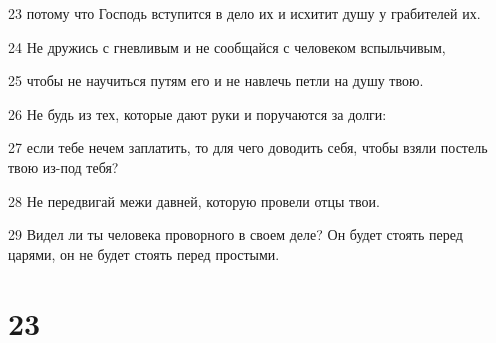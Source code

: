 \par 23 потому что Господь вступится в дело их и исхитит душу у грабителей их.
\par 24 Не дружись с гневливым и не сообщайся с человеком вспыльчивым,
\par 25 чтобы не научиться путям его и не навлечь петли на душу твою.
\par 26 Не будь из тех, которые дают руки и поручаются за долги:
\par 27 если тебе нечем заплатить, то для чего доводить себя, чтобы взяли постель твою из-под тебя?
\par 28 Не передвигай межи давней, которую провели отцы твои.
\par 29 Видел ли ты человека проворного в своем деле? Он будет стоять перед царями, он не будет стоять перед простыми.

\chapter{23}

